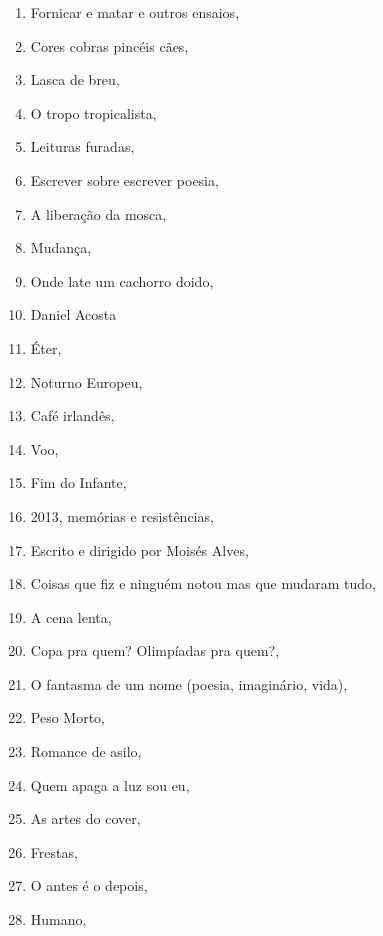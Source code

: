 \begin{multicols}{2}
\begin{enumerate}
\item Fornicar e matar e outros ensaios, {}
\item Cores cobras pincéis cães, {}
\item Lasca de breu, {}
\item O tropo tropicalista, {}
\item Leituras furadas, {}
\item Escrever sobre escrever poesia, {}
\item A liberação da mosca, {}
\item Mudança, {}
\item Onde late um cachorro doido, {}
\item Daniel Acosta
\item Éter, {}
\item Noturno Europeu, {}
\item Café irlandês, {}
\item Voo, {}
\item Fim do Infante, {}
\item 2013, memórias e resistências, {}
\item Escrito e dirigido por Moisés Alves, {}
\item Coisas que fiz e ninguém notou mas que mudaram tudo, {}
\item A cena lenta, {}
\item Copa pra quem? Olimpíadas pra quem?, {}
\item O fantasma de um nome (poesia, imaginário, vida), {}
\item Peso Morto, {}
\item Romance de asilo, {}
\item Quem apaga a luz sou eu, {}
\item As artes do cover, {}
\item Frestas, {}
\item O antes é o depois, {}
\item Humano, {}
\end{enumerate}
\end{multicols}

\pagebreak
